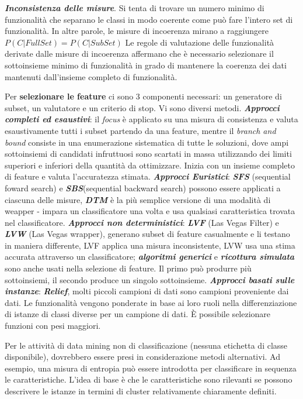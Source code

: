 \documentclass[a4paper]{extarticle}
\begin{document}
\textbf{\textit{Inconsistenza delle misure}}. Si tenta di trovare un numero minimo di funzionalità che separano le classi in modo coerente come può fare l'intero set di funzionalità. In altre parole, le misure di incoerenza mirano a raggiungere $P(C|FullSet)= P(C|SubSet)$ Le regole di valutazione delle funzionalità derivate dalle misure di incoerenza affermano che è necessario selezionare il sottoinsieme minimo di funzionalità in grado di mantenere la coerenza dei dati mantenuti dall'insieme completo di funzionalità.

Per \textbf{selezionare le feature} ci sono 3 componenti necessari: un generatore di subset, un valutatore e un criterio di stop. Vi sono diversi metodi. \textbf{\textit{Approcci completi ed esaustivi}}: il \textit{focus} è applicato su una misura di consistenza e valuta esaustivamente tutti i subset partendo da una feature, mentre il \textit{branch and bound} consiste in una enumerazione sistematica di tutte le soluzioni, dove ampi sottoinsiemi di candidati infruttuosi sono scartati in massa utilizzando dei limiti superiori e inferiori della quantità da ottimizzare. Inizia con un insieme completo di feature e valuta l'accuratezza stimata. \textbf{\textit{Approcci Euristici}}: \textbf{\textit{SFS}} (sequential foward search) e \textbf{\textit{SBS}}(sequential backward search) possono essere applicati a ciascuna delle misure, \textbf{\textit{DTM}} è la più semplice versione  di una modalità di weapper - impara un classificatore una volta e usa qualsiasi caratteristica trovata nel classificatore. \textbf{\textit{Approcci non deterministici}}: \textbf{\textit{LVF}} (Las Vegas Filter) e \textbf{\textit{LVW}} (Las Vegas wrapper), generano subset di feature casualmente e li testano in maniera differente, LVF applica una misura inconsistente, LVW usa una stima accurata attraverso un classificatore; \textbf{\textit{algoritmi generici}} e \textbf{\textit{ricottura simulata}} sono anche usati nella selezione di feature. Il primo può produrre più sottoinsiemi, il secondo produce un singolo sottoinsieme. \textbf{\textit{Approcci basati sulle instanze}}: \textbf{\textit{Relief}}, molti piccoli campioni di dati sono campioni proveniente dai dati. Le funzionalità vengono ponderate in base ai loro ruoli nella differenziazione di istanze di classi diverse per un campione di dati. È possibile selezionare funzioni con pesi maggiori. 

Per le attività di data mining non di classificazione (nessuna etichetta di classe disponibile), dovrebbero essere presi in considerazione metodi alternativi. Ad esempio, una misura di entropia può essere introdotta per classificare in sequenza le caratteristiche. L'idea di base è che le caratteristiche sono rilevanti se possono descrivere le istanze in termini di cluster relativamente chiaramente definiti.
\end{document}
